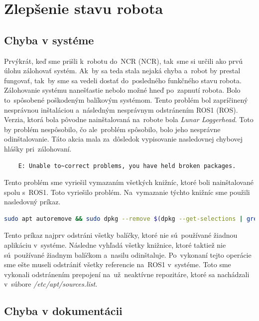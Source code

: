
\section{Zlepšenie stavu robota}

\subsection{Chyba v systéme}
\label{subsec:brokenSystem}

Prvýkrát, keď sme prišli k~robotu do~NCR (\acrlong{NCR}), tak~sme si určili ako prvú úlohu zálohovať systém. Ak~by sa teda stala nejaká chyba
a~robot by prestal fungovať, tak~by sme sa vedeli dostať do~posledného funkčného stavu robota. Zálohovanie systému nanešťastie nebolo možné
hneď po~zapnutí robota. Bolo to~spôsobené poškodeným balíkovým systémom. Tento problém bol zapríčinený nesprávnou
inštaláciou a~následným nesprávnym odstránením ROS1 (\acrlong{ROS}). Verzia, ktorá bola pôvodne nainštalovaná na~robote
bola \textit{Lunar Loggerhead}. Toto by problém nespôsobilo, čo ale~problém spôsobilo, bolo jeho nesprávne odinštalovanie.
Táto akcia mala za~dôsledok vypisovanie nasledovnej chybovej hlášky pri~zálohovaní.

\begin{lstlisting}
	E: Unable to~correct problems, you have held broken packages.
\end{lstlisting}

Tento problém sme vyriešil vymazaním všetkých knižníc, ktoré boli nainštalované spolu s~ROS1. Toto vyriešilo problém. Na~vymazanie týchto
knižníc sme použili nasledovný príkaz.

\begin{lstlisting}[language=bash]
	sudo apt autoremove && sudo dpkg --remove $(dpkg --get-selections | grep hold)
\end{lstlisting}

Tento príkaz najprv odstráni všetky balíčky, ktoré nie sú~používané žiadnou aplikáciu v~systéme. Následne vyhľadá všetky knižnice,
ktoré taktiež nie sú~používané žiadnym balíčkom a~nasilu odinštaluje. Po~vykonaní tejto operácie sme ešte museli odstrániť všetky referencie
na~ROS1 v~systéme. Toto sme vykonali odstránením prepojení na~už~neaktívne repozitáre, ktoré sa nachádzali v~súbore \textit{/etc/apt/sources.list}.

\subsection{Chyba v dokumentácii}
\label{subsec:documentationIssue}

